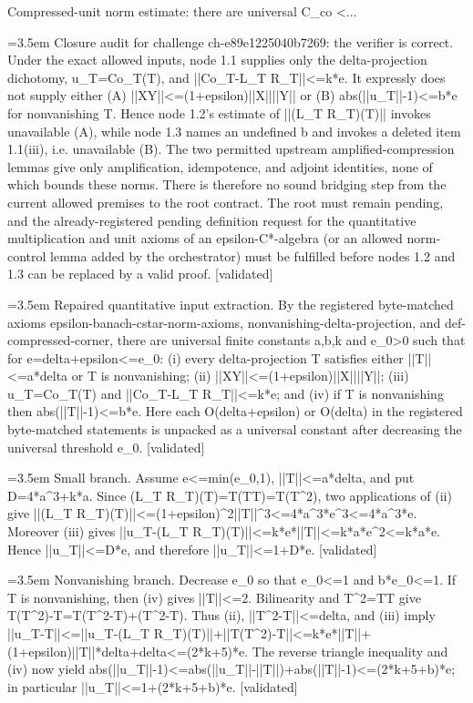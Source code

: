 \documentclass{article}
\newcommand{\step}[1]{\par\noindent\hangindent=3.5em\hangafter=1%
  \makebox[3.5em][l]{\textbf{#1.}}}
\newcommand{\steptag}[1]{\hfill{\small\textsf{[#1]}}}
\begin{document}
\begin{proofbox}{Compressed-unit norm estimate: there are universal C\_co <...}
\step{1.4} Closure audit for challenge ch-e89e1225040b7269: the verifier is correct. Under the exact allowed inputs, node 1.1 supplies only the delta-projection dichotomy, u\_T=Co\_T(T), and ||Co\_T-L\_T R\_T||<=k*e. It expressly does not supply either (A) ||XY||<=(1+epsilon)||X||||Y|| or (B) abs(||u\_T||-1)<=b*e for nonvanishing T. Hence node 1.2's estimate of ||(L\_T R\_T)(T)|| invokes unavailable (A), while node 1.3 names an undefined b and invokes a deleted item 1.1(iii), i.e. unavailable (B). The two permitted upstream amplified-compression lemmas give only amplification, idempotence, and adjoint identities, none of which bounds these norms. There is therefore no sound bridging step from the current allowed premises to the root contract. The root must remain pending, and the already-registered pending definition request for the quantitative multiplication and unit axioms of an epsilon-C*-algebra (or an allowed norm-control lemma added by the orchestrator) must be fulfilled before nodes 1.2 and 1.3 can be replaced by a valid proof. \steptag{validated} \\[4pt]
\step{1.5} Repaired quantitative input extraction. By the registered byte-matched axioms epsilon-banach-cstar-norm-axioms, nonvanishing-delta-projection, and def-compressed-corner, there are universal finite constants a,b,k and e\_0>0 such that for e=delta+epsilon<=e\_0: (i) every delta-projection T satisfies either ||T||<=a*delta or T is nonvanishing; (ii) ||XY||<=(1+epsilon)||X||||Y||; (iii) u\_T=Co\_T(T) and ||Co\_T-L\_T R\_T||<=k*e; and (iv) if T is nonvanishing then abs(||T||-1)<=b*e. Here each O(delta+epsilon) or O(delta) in the registered byte-matched statements is unpacked as a universal constant after decreasing the universal threshold e\_0. \steptag{validated} \\[4pt]
\step{1.6} Small branch. Assume e<=min(e\_0,1), ||T||<=a*delta, and put D=4*a\textasciicircum{}3+k*a. Since (L\_T R\_T)(T)=T(TT)=T(T\textasciicircum{}2), two applications of (ii) give ||(L\_T R\_T)(T)||<=(1+epsilon)\textasciicircum{}2||T||\textasciicircum{}3<=4*a\textasciicircum{}3*e\textasciicircum{}3<=4*a\textasciicircum{}3*e. Moreover (iii) gives ||u\_T-(L\_T R\_T)(T)||<=k*e*||T||<=k*a*e\textasciicircum{}2<=k*a*e. Hence ||u\_T||<=D*e, and therefore ||u\_T||<=1+D*e. \steptag{validated} \\[4pt]
\step{1.7} Nonvanishing branch. Decrease e\_0 so that e\_0<=1 and b*e\_0<=1. If T is nonvanishing, then (iv) gives ||T||<=2. Bilinearity and T\textasciicircum{}2=TT give T(T\textasciicircum{}2)-T=T(T\textasciicircum{}2-T)+(T\textasciicircum{}2-T). Thus (ii), ||T\textasciicircum{}2-T||<=delta, and (iii) imply ||u\_T-T||<=||u\_T-(L\_T R\_T)(T)||+||T(T\textasciicircum{}2)-T||<=k*e*||T||+(1+epsilon)||T||*delta+delta<=(2*k+5)*e. The reverse triangle inequality and (iv) now yield abs(||u\_T||-1)<=abs(||u\_T||-||T||)+abs(||T||-1)<=(2*k+5+b)*e; in particular ||u\_T||<=1+(2*k+5+b)*e. \steptag{validated} \\[4pt]

\end{proofbox}
\end{document}
